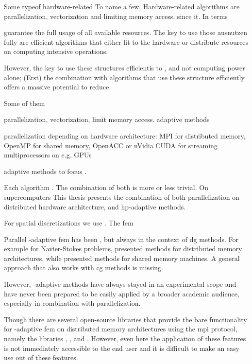 Some typeof hardware-related 
To name a few, Hardware-related algorithms are parallelization, vectorization and limiting memory access, since it. In terms 


guarantee the full usage of all available resources. The key to use those ausnutzen fully are efficient algorithms that either fit to the hardware or distribute resources on computing intensive operations.

However, the key to use these structures efficientis to , and not computing power alone; (Erst) the combination with algorithms that use these structure efficiently offers a massive potential to reduce 




Some of them

parallelization, vectorization, limit memory access. adaptive methods

parallelization depending on hardware architecture: MPI for distributed memory, OpenMP for shared memory, OpenACC or nVidia CUDA for streaming multiprocessors on e.g. GPUs

adaptive methods to focus .


Each algorithm . The combination of both is more or less trivial.
On supercomputers
This thesis presents the combination of both parallelization on distributed hardware architecture, and hp-adaptive methods.

For spatial discretizations we use . The \gls{fem}


Parallel \hp-adaptive \gls{fem} has been , but always in the context of \gls{dg} methods. For example for Navier-Stokes problems, \textcite{chalmers2019} presented methods for distributed memory architectures, while \textcites{paszynski2011}{jomo2017} presented methods for shared memory machines. A general approach that also works with \gls{cg} methods is missing.

However, \hp-adaptive methods have always stayed in an experimental scope and have never been prepared to be easily applied by a broader academic audience, especially in combination with parallelization.

Though there are several open-source libraries that provide the bare functionality for \hp-adaptive \gls{fem} on distributed memory architectures using the \gls{mpi} protocol, namely the libraries \phaml{} \parencites{mitchell2002}{phaml1200}, \phg{} \parencites{zhanglin-bo2019}{phg094}, and \mofem{} \parencites{kaczmarczyk2020}{mofem090}. However, even here the application of these features is not immediately accessible to the end user and it is difficult to make an easy use out of these features.

